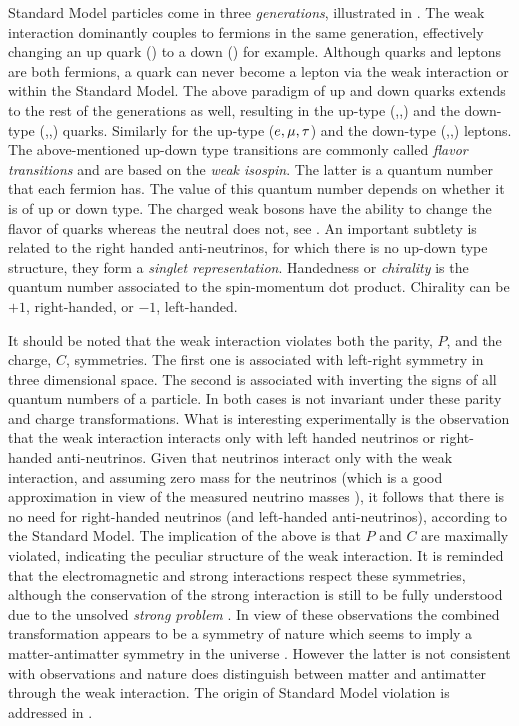 Standard Model particles come in three {\it generations}, illustrated in .
The weak interaction dominantly couples to fermions in the same generation, effectively changing an up quark (\uquark) to a down (\dquark) for example.
Although quarks and leptons are both fermions, a quark can never become a lepton via the weak interaction or \viceversa within the Standard Model.
The above paradigm of up and down quarks extends to the rest of the generations as well, resulting in the up-type (\uquark,\cquark,\tquark)
and the down-type (\dquark,\squark,\bquark) quarks. Similarly for the  up-type ($e,\mu,\tau$) and the down-type (\neue,\neum,\neut)
leptons. The above-mentioned up-down type transitions are commonly called {\it flavor transitions} and are based on the
{\it weak isospin}. The latter is a quantum number that each fermion has. The value of this quantum number depends on whether it is of up or down type.
The charged weak bosons \Wpm have the ability to change the flavor of quarks whereas the neutral \Z does not, see .
An important subtlety is related to the right handed anti-neutrinos, for which there is no up-down type structure,
\ie they form a  {\it singlet representation}. Handedness or {\it chirality} is the quantum number associated to the
spin-momentum dot product. Chirality can be $+1$, right-handed, or $-1$, left-handed.

It should be noted that the weak interaction violates both the parity, $P$, and the charge, $C$, symmetries.
The first one is associated with left-right symmetry in three dimensional space.
The second is associated with inverting the signs of all quantum numbers of a particle.
In both cases  is not invariant under these parity and charge transformations.
What is interesting experimentally is the observation \cite{wu-parity,garwin-parity} that the weak interaction interacts
only with left handed neutrinos or right-handed anti-neutrinos. Given that neutrinos interact only with the weak interaction,
and assuming zero mass for the neutrinos (which is a good approximation in view of the measured neutrino masses \cite{nu-mass-superkam,nu-mass-kamland,nu-mass-sno,nu-mass-daya}),
it follows that there is no need for right-handed neutrinos (and left-handed anti-neutrinos), according to the Standard Model.
The implication of the above is that $P$ and $C$ are maximally violated, indicating the
peculiar structure of the weak interaction. It is reminded that the electromagnetic and
strong interactions respect these symmetries, although the \CP conservation of the strong interaction is still to be fully
understood due to the unsolved {\it strong \CP problem} \cite{Peccei:2006as}.
In view of these observations the combined \CP transformation appears to be
a symmetry of nature which seems to imply a matter-antimatter symmetry in the universe \cite{Sakharov:1967dj}.
However the latter is not consistent with observations and nature does distinguish between matter and antimatter
through the weak interaction. The origin of Standard Model \CP violation is addressed in .

